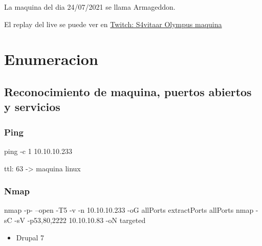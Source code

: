\documentclass{assets/ipesethesis}
\newenvironment{Shaded}{\begin{snugshade}}{\end{snugshade}}
\newcommand{\ExtensionTok}[1]{#1}
\newcommand{\FunctionTok}[1]{\textcolor[rgb]{0.00,0.00,0.00}{#1}}
\newcommand{\NormalTok}[1]{#1}
\providecommand{\tightlist}{%
  \setlength{\itemsep}{0pt}\setlength{\parskip}{0pt}}
\begin{document}
La maquina del dia 24/07/2021 se llama Armageddon.

El replay del live se puede ver en \href{https://www.twitch.tv/videos/1096891939}{Twitch: S4vitaar Olympus maquina}

\hypertarget{enumeracion-2}{%
\section*{Enumeracion}\label{enumeracion-2}}

\hypertarget{reconocimiento-de-maquina-puertos-abiertos-y-servicios-2}{%
\subsection*{Reconocimiento de maquina, puertos abiertos y servicios}\label{reconocimiento-de-maquina-puertos-abiertos-y-servicios-2}}

\hypertarget{ping-2}{%
\subsubsection*{Ping}\label{ping-2}}

\begin{Shaded}
\begin{Highlighting}[]
\FunctionTok{ping}\NormalTok{ -c 1 10.10.10.233}
\end{Highlighting}
\end{Shaded}

ttl: 63 -\textgreater{} maquina linux

\hypertarget{nmap-2}{%
\subsubsection*{Nmap}\label{nmap-2}}

\begin{Shaded}
\begin{Highlighting}[]
\FunctionTok{nmap}\NormalTok{ -p- --open -T5 -v -n 10.10.10.233 -oG allPorts}
\ExtensionTok{extractPorts}\NormalTok{ allPorts}
\FunctionTok{nmap}\NormalTok{ -sC -sV -p53,80,2222 10.10.10.83 -oN targeted}
\end{Highlighting}
\end{Shaded}

\begin{itemize}
\tightlist
\item
  Drupal 7
\end{itemize}
\end{document}
